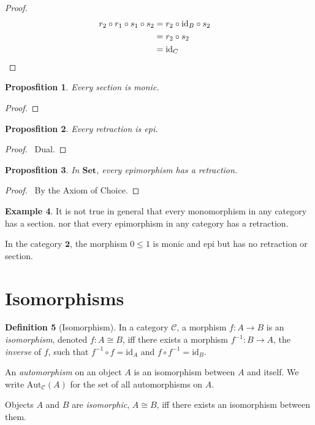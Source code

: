 \documentclass{book}
\let\qed\relax
\newtheorem{prop}{Proposfition}[chapter]
\theoremstyle{definition}
\newtheorem{df}[prop]{Definition}
\newtheorem{ex}[prop]{Example}
\newcommand{\id}[1]{\ensuremath{\mathrm{id}_{#1}}}
\newcommand{\Set}{\ensuremath{\mathbf{Set}}}
\begin{document}
\begin{proof}
    \pf
    \begin{align*}
        r_2 \circ r_1 \circ s_1 \circ s_2 & = r_2 \circ \id{B} \circ s_2        \\
                                          & = r_2 \circ s_2                     \\
                                          & = \id{C}                     & \qed
    \end{align*}
\end{proof}

\begin{prop}
    Every section is monic.
\end{prop}

\begin{proof}
    \pf
    \qed
\end{proof}

\begin{prop}
    Every retraction is epi.
\end{prop}

\begin{proof}
    \pf\ Dual. \qed
\end{proof}

\begin{prop}
    In $\Set$, every epimorphism has a retraction.
\end{prop}

\begin{proof}
    \pf\ By the Axiom of Choice. \qed
\end{proof}

\begin{ex}
    It is not true in general that every monomorphism in any category has a section. nor that every epimorphism in any category has a retraction.

    In the category $\mathbf{2}$, the morphism $0 \leq 1$ is monic and epi but has
    no retraction or section.
\end{ex}


\section{Isomorphisms}

\begin{df}[Isomorphism]
    In a category $\mathcal{C}$, a morphism $f : A \rightarrow B$ is an \emph{isomorphism}, denoted $f : A \cong B$, iff there exists a morphism $f^{-1} : B \rightarrow A$, the \emph{inverse} of $f$, such that $f^{-1} \circ f = \id{A}$ and $f \circ f^{-1} = \id{B}$.

    An \emph{automorphism} on an object $A$ is an isomorphism between $A$ and
    itself. We write $\mathrm{Aut}_\mathcal{C}(A)$ for the set of all automorphisms
    on $A$.

    Objects $A$ and $B$ are \emph{isomorphic}, $A \cong B$, iff there exists an
    isomorphism between them.
\end{df}
\end{document}
